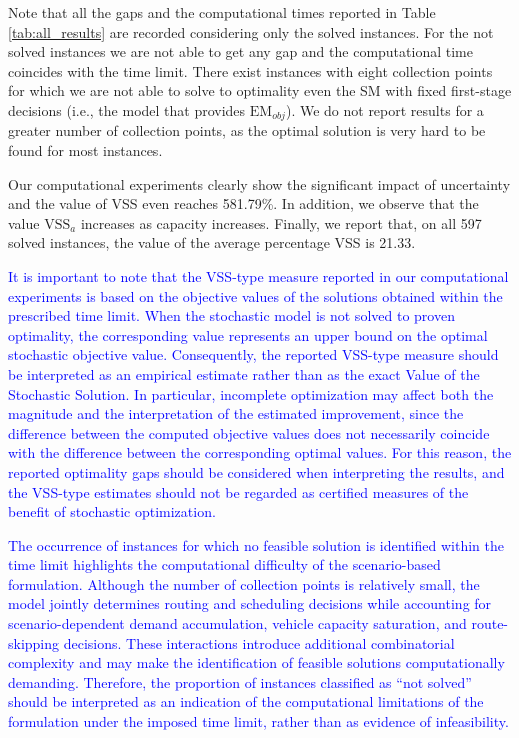 \documentclass[authoryear,preprint,12pt]{elsarticle}
\newcommand{\rev}[1]{\textcolor{blue}{{#1}}}
\begin{document}
Note that all the gaps and the computational times reported in Table \ref{tab:all_results} are recorded considering only the solved instances. For the not solved instances we are not able to get any gap and the computational time coincides with the time limit.
There exist instances with eight collection points for which we are not able to solve to optimality even the SM with fixed first-stage decisions (i.e., the model that provides $\text{EM}_{obj}$).
%
We do not report results for a greater number of collection points, as the optimal solution is very hard to be found for most instances. 

Our computational experiments clearly show the significant impact of uncertainty and the value of VSS even reaches 581.79\%. In addition, we observe that the value $\text{VSS}_a$ increases as capacity increases. Finally, we report that, on all 597 solved instances, the value of the average percentage VSS is 21.33.


\rev{It is important to note that the VSS-type measure reported in our computational experiments is based on the objective values of the solutions obtained within the prescribed time limit. When the stochastic model is not solved to proven optimality, the corresponding value represents an upper bound on the optimal stochastic objective value. Consequently, the reported VSS-type measure should be interpreted as an empirical estimate rather than as the exact Value of the Stochastic Solution. In particular, incomplete optimization may affect both the magnitude and the interpretation of the estimated improvement, since the difference between the computed objective values does not necessarily coincide with the difference between the corresponding optimal values. For this reason, the reported optimality gaps should be considered when interpreting the results, and the VSS-type estimates should not be regarded as certified measures of the benefit of stochastic optimization.}



\rev{The occurrence of instances for which no feasible solution is identified within the time limit highlights the computational difficulty of the scenario-based formulation. Although the number of collection points is relatively small, the model jointly determines routing and scheduling decisions while accounting for scenario-dependent demand accumulation, vehicle capacity saturation, and route-skipping decisions. These interactions introduce additional combinatorial complexity and may make the identification of feasible solutions computationally demanding. Therefore, the proportion of instances classified as ``not solved'' should be interpreted as an indication of the computational limitations of the formulation under the imposed time limit, rather than as evidence of infeasibility.}
\end{document}
